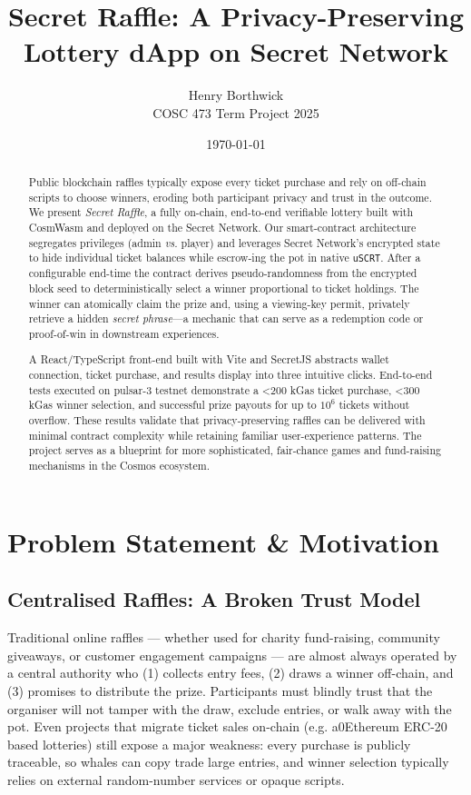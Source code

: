 \documentclass[12pt]{article}
\title{Secret Raffle: A Privacy-Preserving Lottery dApp on Secret Network}
\author{Henry Borthwick \\ COSC 473 Term Project 2025}
\date{\today}
\begin{document}
\maketitle

\begin{abstract}
Public blockchain raffles typically expose every ticket purchase and rely on off-chain scripts to choose winners, eroding both participant privacy and trust in the outcome.  We present \emph{Secret Raffle}, a fully on-chain, end-to-end verifiable lottery built with CosmWasm and deployed on the Secret Network.  Our smart-contract architecture segregates privileges (admin \emph{vs.} player) and leverages Secret Network's encrypted state to hide individual ticket balances while escrow-ing the pot in native \texttt{uSCRT}.  After a configurable end-time the contract derives pseudo-randomness from the encrypted block seed to deterministically select a winner proportional to ticket holdings.  The winner can atomically claim the prize and, using a viewing-key permit, privately retrieve a hidden \emph{secret phrase}—a mechanic that can serve as a redemption code or proof-of-win in downstream experiences.

A React/TypeScript front-end built with Vite and SecretJS abstracts wallet connection, ticket purchase, and results display into three intuitive clicks.  End-to-end tests executed on pulsar-3 testnet demonstrate a \textless200 kGas ticket purchase, \textless300 kGas winner selection, and successful prize payouts for up to \(10^{6}\) tickets without overflow.  These results validate that privacy-preserving raffles can be delivered with minimal contract complexity while retaining familiar user-experience patterns.  The project serves as a blueprint for more sophisticated, fair-chance games and fund-raising mechanisms in the Cosmos ecosystem.
\end{abstract}


\section*{Problem Statement \& Motivation}

\subsection*{Centralised Raffles: A Broken Trust Model}
Traditional online raffles --- whether used for charity fund-raising, community giveaways, or customer engagement campaigns --- are almost always operated by a central authority who (1) collects entry fees, (2) draws a winner off-chain, and (3) promises to distribute the prize.  Participants must blindly trust that the organiser will not tamper with the draw, exclude entries, or walk away with the pot.  Even projects that migrate ticket sales on-chain (e.g. a0Ethereum ERC-20 based lotteries) still expose a major weakness: every purchase is publicly traceable, so whales can copy trade large entries, and winner selection typically relies on external random-number services or opaque scripts.
\end{document}
